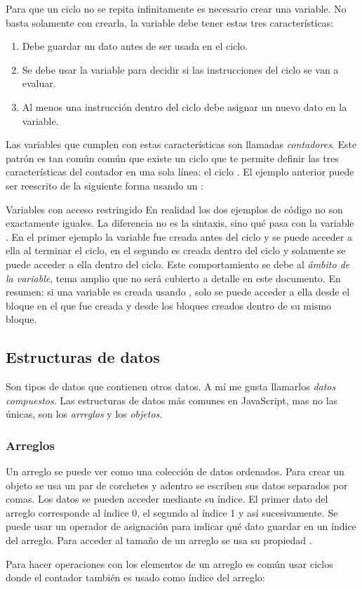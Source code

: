 \documentclass{article}
\newcommand{\code}[1]{\tcbox{\texttt{#1}}}
\newcommand{\codejs}[1]{\tcbox{\lstinline[style=ES6]{#1}}}
\begin{document}
Para que un ciclo no se repita infinitamente es necesario crear una variable. No basta solamente con crearla, la variable debe tener estas tres características:
\begin{enumerate}
  \item Debe guardar un dato antes de ser usada en el ciclo.
  \item Se debe usar la variable para decidir si las instrucciones del ciclo se van a evaluar.
  \item Al menos una instrucción dentro del ciclo debe asignar un nuevo dato en la variable.
\end{enumerate}
Las variables que cumplen con estas características son llamadas \textit{contadores}. Este patrón es tan común común que existe un ciclo que te permite definir las tres características del contador en una sola línea: el ciclo \codejs{for}. El ejemplo anterior puede ser reescrito de la siguiente forma usando un \codejs{for}:

\begin{bclogo}[logo=\bcinfo, couleurBarre=orange, noborder=true, couleur=white]{Variables con acceso restringido}
En realidad los dos ejemplos de código no son exactamente iguales. La diferencia no es la sintaxis, sino qué pasa con la variable \codejs{número}. En el primer ejemplo la variable fue creada antes del ciclo \codejs{while} y se puede acceder a ella al terminar el ciclo, en el segundo es creada dentro del ciclo \codejs{for} y solamente se puede acceder a ella dentro del ciclo. Este comportamiento se debe al \textit{ámbito de la variable}\cite{scope}, tema amplio que no será cubierto a detalle en este documento. En resumen: si una variable es creada usando \codejs{let}, solo se puede acceder a ella desde el bloque en el que fue creada y desde los bloques creados dentro de su mismo bloque.
\end{bclogo}


\subsection{Estructuras de datos}
Son tipos de datos que contienen otros datos. A mí me gusta llamarlos \textit{datos compuestos}. Las estructuras de datos más comunes en JavaScript, mas no las únicas, son los \textit{arreglos} y los \textit{objetos}.
\subsubsection{Arreglos}
Un arreglo se puede ver como una colección de datos ordenados. Para crear un objeto se usa un par de corchetes \codejs{[ ]} y adentro se escriben sus datos separados por comas. Los datos se pueden acceder mediante su índice. El primer dato del arreglo corresponde al índice 0, el segundo al índice 1 y así sucesivamente. Se puede usar un operador de asignación para indicar qué dato guardar en un índice del arreglo. Para acceder al tamaño de un arreglo se usa su propiedad \code{length}.

Para hacer operaciones con los elementos de un arreglo es común usar ciclos donde el contador también es usado como índice del arreglo:

\end{document}
